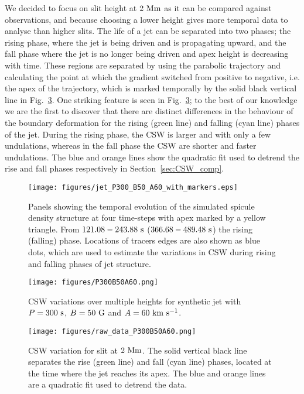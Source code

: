 We decided to focus on slit height at $2~\rm{Mm}$ as it can be compared against observations, and because choosing a lower height gives more temporal data to analyse than higher slits. The life of a jet can be separated into two phases; the rising phase, where the jet is being driven and is propagating upward, and the fall phase where the jet is no longer being driven and apex height is decreasing with time. These regions are separated by using the parabolic trajectory and calculating the point at which the gradient switched from positive to negative, i.e. the apex of the trajectory, which is marked temporally by the solid black vertical line in Fig.~\ref{CSW_2m_height}. One striking feature is seen in Fig.~\ref{CSW_2m_height}; to the best of our knowledge we are the first to discover that there are distinct differences in the behaviour of the boundary deformation for the rising (green line) and falling (cyan line) phases of the jet. During the rising phase, the CSW is larger and with only a few undulations,  whereas in the fall phase the CSW are shorter and faster undulations. The blue and orange lines show the quadratic fit used to detrend the rise and fall phases respectively in Section~\ref{sec:CSW_comp}.
\begin{figure*}
\texttt{[image: figures/jet\_P300\_B50\_A60\_with\_markers.eps]}
\caption{Panels showing the temporal evolution of the simulated spicule density structure at four time-steps with apex marked by a yellow triangle. From $121.08-243.88 ~\rm{s}$ ($366.68-489.48~\rm{s}$)  the rising (falling) phase. Locations of tracers edges are also shown as blue dots, which are used to estimate the variations in CSW during rising and falling phases of jet structure.}
\label{jet_P300_B50_A60} 
\end{figure*}

\begin{figure*}
\texttt{[image: figures/P300B50A60.png]}
\caption{CSW variations over multiple heights for synthetic jet with $P=300~\rm{s}$, $B=50~\rm{G}$ and $A=60~\rm{km ~s^{-1}}$.} 
\label{CSW_m_heights} 
\end{figure*}

\begin{figure*}
\texttt{[image: figures/raw\_data\_P300B50A60.png]}
\caption{CSW variation for slit at $2~\rm{Mm}$. The solid vertical black line separates the rise (green line) and fall (cyan line) phases, located at the time where the jet reaches its apex. The blue and orange lines are a quadratic fit used to detrend the data.}  
\label{CSW_2m_height} 
\end{figure*}
